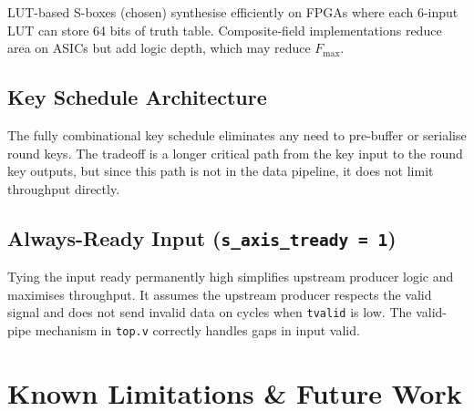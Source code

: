 \documentclass[12pt,a4paper]{article}
\begin{document}
LUT-based S-boxes (chosen) synthesise efficiently on FPGAs where each
6-input LUT can store 64 bits of truth table. Composite-field implementations
reduce area on ASICs but add logic depth, which may reduce $F_{\max}$.

\subsection{Key Schedule Architecture}

The fully combinational key schedule eliminates any need to pre-buffer or
serialise round keys. The tradeoff is a longer critical path from the key
input to the round key outputs, but since this path is not in the data
pipeline, it does not limit throughput directly.

\subsection{Always-Ready Input (\texttt{s\_axis\_tready = 1})}

Tying the input ready permanently high simplifies upstream producer logic
and maximises throughput. It assumes the upstream producer respects the
valid signal and does not send invalid data on cycles when
\texttt{tvalid} is low. The valid-pipe mechanism in \texttt{top.v} correctly
handles gaps in input valid.

\section{Known Limitations \& Future Work}
\end{document}

